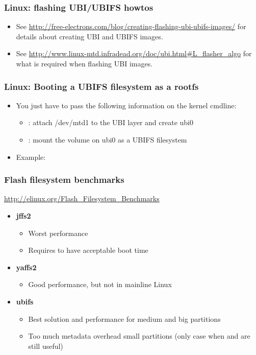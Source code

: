 \begin{frame}
  \frametitle{Linux: flashing UBI/UBIFS howtos}
  \begin{itemize}
  \item See
    \url{http://free-electrons.com/blog/creating-flashing-ubi-ubifs-images/}
    for details about creating UBI and UBIFS images.
  \item See
    \url{http://www.linux-mtd.infradead.org/doc/ubi.html\#L_flasher_algo}
    for what is required when flashing UBI images.
  \end{itemize}
\end{frame}

\begin{frame}
  \frametitle{Linux: Booting a UBIFS filesystem as a rootfs}
  \begin{itemize}
  \item You just have to pass the following information on the kernel
    cmdline:
    \begin{itemize}
    \item {}: attach /dev/mtd1 to the UBI layer and
      create ubi0
    \item {}: mount the
       volume on ubi0 as a UBIFS filesystem
    \end{itemize}
  \item Example: 
  \end{itemize}
\end{frame}

\begin{frame}
  \frametitle{Flash filesystem benchmarks}
  \url{http://elinux.org/Flash_Filesystem_Benchmarks}
  \begin{itemize}
  \item {\bf jffs2}
    \begin{itemize}
    \item Worst performance
    \item Requires  to have acceptable boot time
    \end{itemize}
  \item {\bf yaffs2}
    \begin{itemize}
    \item Good performance, but not in mainline Linux
    \end{itemize}
  \item {\bf ubifs}
    \begin{itemize}
    \item Best solution and performance for medium and big
      partitions
    \item Too much metadata overhead small partitions (only case
      when  and  are still useful)
    \end{itemize}
  \end{itemize}
\end{frame}

